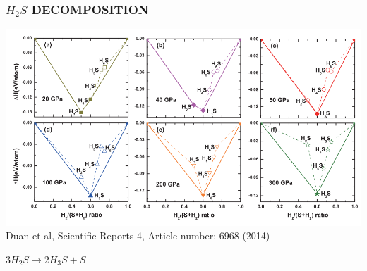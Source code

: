 \documentclass[amssymb,amsmath]{beamer}
\begin{document}
\begin{frame}
\frametitle{$H_2S$ DECOMPOSITION}
\centering
\includegraphics[scale=0.3]{./figures/decomposition_duan.png}\\
Duan et al, Scientific Reports 4, Article number: 6968 (2014)

\begin{block}{}
$3H_2S\rightarrow 2H_3S+S$
\end{block}
\end{frame}
\end{document}
